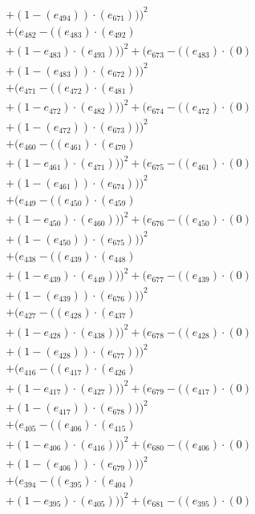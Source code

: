 \documentclass[10pt, a4paper]{article}
\begin{document}
\begin{align*}
& + (1 - (e_{494})) \cdot (e_{671})))^{2} \\
& + (e_{482} - ((e_{483})  \cdot  (e_{492}) \\
& + (1 - e_{483})  \cdot  (e_{493})))^{2} + (e_{673} - ((e_{483}) \cdot (0) \\
& + (1 - (e_{483})) \cdot (e_{672})))^{2} \\
& + (e_{471} - ((e_{472})  \cdot  (e_{481}) \\
& + (1 - e_{472})  \cdot  (e_{482})))^{2} + (e_{674} - ((e_{472}) \cdot (0) \\
& + (1 - (e_{472})) \cdot (e_{673})))^{2} \\
& + (e_{460} - ((e_{461})  \cdot  (e_{470}) \\
& + (1 - e_{461})  \cdot  (e_{471})))^{2} + (e_{675} - ((e_{461}) \cdot (0) \\
& + (1 - (e_{461})) \cdot (e_{674})))^{2} \\
& + (e_{449} - ((e_{450})  \cdot  (e_{459}) \\
& + (1 - e_{450})  \cdot  (e_{460})))^{2} + (e_{676} - ((e_{450}) \cdot (0) \\
& + (1 - (e_{450})) \cdot (e_{675})))^{2} \\
& + (e_{438} - ((e_{439})  \cdot  (e_{448}) \\
& + (1 - e_{439})  \cdot  (e_{449})))^{2} + (e_{677} - ((e_{439}) \cdot (0) \\
& + (1 - (e_{439})) \cdot (e_{676})))^{2} \\
& + (e_{427} - ((e_{428})  \cdot  (e_{437}) \\
& + (1 - e_{428})  \cdot  (e_{438})))^{2} + (e_{678} - ((e_{428}) \cdot (0) \\
& + (1 - (e_{428})) \cdot (e_{677})))^{2} \\
& + (e_{416} - ((e_{417})  \cdot  (e_{426}) \\
& + (1 - e_{417})  \cdot  (e_{427})))^{2} + (e_{679} - ((e_{417}) \cdot (0) \\
& + (1 - (e_{417})) \cdot (e_{678})))^{2} \\
& + (e_{405} - ((e_{406})  \cdot  (e_{415}) \\
& + (1 - e_{406})  \cdot  (e_{416})))^{2} + (e_{680} - ((e_{406}) \cdot (0) \\
& + (1 - (e_{406})) \cdot (e_{679})))^{2} \\
& + (e_{394} - ((e_{395})  \cdot  (e_{404}) \\
& + (1 - e_{395})  \cdot  (e_{405})))^{2} + (e_{681} - ((e_{395}) \cdot (0) \\

\end{align*}
\end{document}
